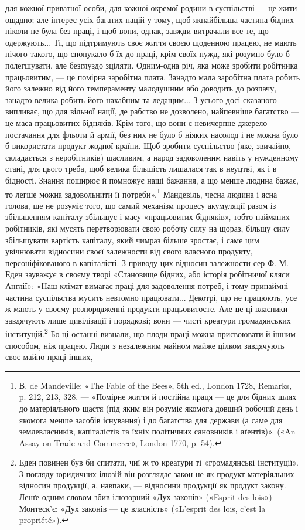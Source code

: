 для кожної приватної особи, для кожної окремої родини в суспільстві
— це жити ощадно; але інтерес усіх багатих націй у
тому, щоб якнайбільша частина бідних ніколи не була без праці,
і щоб вони, однак, завжди витрачали все те, що одержують...
Ті, що підтримують своє життя своєю щоденною працею, не
мають нічого такого, що спонукало б їх до праці, крім своїх
нужд, які розумно було б полегшувати, але безглуздо зціляти.
Одним-одна річ, яка може зробити робітника працьовитим, —
це помірна заробітна плата. Занадто мала заробітна плата робить
його залежно від його темпераменту малодушним або доводить
до розпачу, занадто велика робить його нахабним та ледащим...
З усього досі сказаного випливає, що для вільної нації, де рабство
не дозволено, найпевніше багатство — це маса працьовитих бідняків.
Крім того, що вони є невичерпне джерело постачання для
фльоти й армії, без них не було б ніяких насолод і не можна
було б використати продукт жодної країни. Щоб зробити суспільство
(яке, звичайно, складається з неробітників) щасливим, а
народ задоволеним навіть у нужденному стані, для цього треба,
щоб велика більшість лишалася так в неуцтві, як і в бідності.
Знання поширює й помножує наші бажання, а що менше людина
бажає, то легше можна задовольнити її потреби».\footnote{
В. de Mandeville: «The Fable of the Bees», 5th ed., London 1728,
Remarks, p. 212, 213, 328. — «Помірне життя й постійна праця — це для
бідних шлях до матеріяльного щастя (під яким він розуміє якомога довший
робочий день і якомога менше засобів існування) і до багатства для
держави (а саме для землевласників, капіталістів та їхніх політичних
сановників і аґентів)». («An Assay on Trade and Commerce», London
1770, p. 54).
} Мандевіль,
чесна людина і ясна голова, ще не розуміє того, що самий механізм
процесу акумуляції разом із збільшенням капіталу збільшує
і масу «працьовитих бідняків», тобто найманих робітників,
які мусять перетворювати свою робочу силу на щораз, більшу
силу збільшувати вартість капіталу, який чимраз більше зростає,
і саме цим увічнювати відносини своєї залежности від
свого власного продукту, персоніфікованого в капіталісті. З приводу
цих відносин залежности сер Ф. М. Еден зауважує в своєму
творі «Становище бідних, або історія робітничої кляси Англії»:
«Наш клімат вимагає праці для задоволення потреб, і тому
принаймні частина суспільства мусить невтомно працювати...
Декотрі, що не працюють, усе ж мають у своєму розпорядженні
продукти працьовитосте. Але це ці власники завдячують лише
цивілізації і порядкові; вони — чисті креатури громадянських
інституцій.\footnote{
Еден повинен був би спитати, чиї ж то креатури ті «громадянські
інституції». З погляду юридичних ілюзій він розглядає закон не як
продукт матеріяльних відносин продукції, а, навпаки, — відносини продукції
як продукт закону. Ленґе одним словом збив ілюзорний «Дух
законів» («Esprit des lois») Монтеск’є: «Дух законів — це власність»
(«L’esprit des lois, c’est la propriété»).
} Бо ці останні визнали, що плоди праці можна
присвоювати й іншим способом, ніж працею. Люди з незалежним
майном майже цілком завдячують своє майно праці інших,